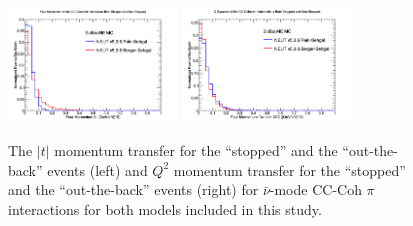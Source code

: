 \documentclass[11pt]{article}
\begin{document}
\begin{figure}[H]
\centering
\includegraphics[width=0.4\textwidth]{CCCohPlots/ANMCCCohGoodT.png}
\includegraphics[width=0.4\textwidth]{CCCohPlots/ANMCCCohGoodQ2.png}
\caption{The $|t|$ momentum transfer for the ``stopped'' and the ``out-the-back'' events (left) and $Q^2$ momentum transfer for the ``stopped'' and the ``out-the-back'' events (right) for $\bar{\nu}$-mode CC-Coh $\pi$ interactions for both models included in this study.}
\label{fig:app:ANMTQ2}
\end{figure}



%
\end{document}
